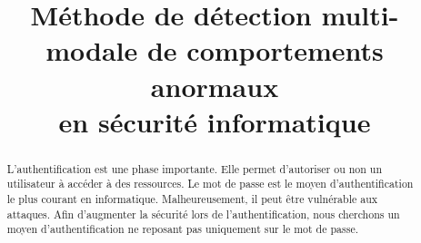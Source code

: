 \documentclass[conference,compsoc]{IEEEtran}
\begin{document}
%
\title{Méthode de détection multi-modale de comportements anormaux\\ en sécurité informatique}

\author{
\and
{}
\and
{}
\and
{}
}


\maketitle

\begin{abstract}
L'authentification est une phase importante. Elle permet d'autoriser ou non un utilisateur à accéder à des ressources. Le mot de passe est le moyen d'authentification le plus courant en informatique. Malheureusement, il peut être vulnérable aux attaques. Afin d'augmenter la sécurité lors de l'authentification, nous cherchons un moyen d'authentification ne reposant pas uniquement sur le mot de passe.
\end{abstract}


%
\IEEEpeerreviewmaketitle
\end{document}
